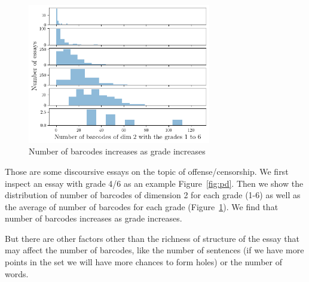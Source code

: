 \begin{figure}[htbp]
\includegraphics[width=8cm]{gradesh1.png}
\caption{Number of barcodes increases as grade increases}
\label{fig:ds}
\end{figure}

Those are some discoursive essays on the topic of offense/censorship. We first inspect
an essay with grade 4/6 as an example Figure~\ref{fig:pd}. Then we show
the distribution of number of barcodes of dimension 2 for each grade (1-6)
as well as the average of number of barcodes for each grade (Figure~\ref{fig:ds}).
We find that number of barcodes increases as grade increases.

But there are other factors other than the richness of structure of the essay that may affect
the number of barcodes, like the number of sentences (if we have more points in the set
we will have more chances to form holes) or the number of words.

